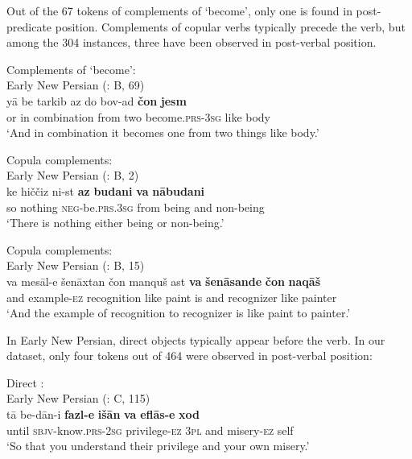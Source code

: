 \documentclass[output=paper,colorlinks,citecolor=brown,draftmode]{langscibook}
\begin{document}
Out of the 67 tokens of complements of `become', only one is found in post-predicate position. Complements of copular verbs typically precede the verb, but among the 304 instances, three have been observed in post-verbal position.

\ea\label{ENP:ex:12}
Complements of `become': \\
Early New Persian (\citealt{parizadeh_persian_2022}: B, 69) \\
\gll yā be tarkib az do bov-ad \textbf{čon} \textbf{jesm} \\
or in combination from two become\textsc{.prs-3sg} like body \\
\glt `And in combination it becomes one from two things like body.'
\z


\newpage
\ea\label{ENP:ex:13}
Copula complements: \\
Early New Persian (\citealt{parizadeh_persian_2022}: B, 2) \\
\gll ke hiččiz ni-st \textbf{az} \textbf{budani} \textbf{va} \textbf{nābudani} \\
so nothing \textsc{neg-}be\textsc{.prs.3sg} from being and non-being \\
\glt `There is nothing either being or non-being.'
\z

\ea\label{ENP:ex:14}
Copula complements: \\
Early New Persian (\citealt{parizadeh_persian_2022}: B, 15) \\
\gll va mesāl-e šenāxtan čon manquš ast \textbf{va} \textbf{šenāsande} \textbf{čon} \textbf{naqāš} \\
and example\textsc{-ez} recognition like paint is and recognizer like painter \\
\glt `And the example of recognition to recognizer is like paint to painter.' 
\z

In Early New Persian, direct objects typically appear before the verb. In our dataset, only four tokens out of 464 were observed in post-verbal position:

\ea\label{ENP:ex:15}
Direct : \\
Early New Persian (\citealt{parizadeh_persian_2022}: C, 115) \\
\gll tā be-dān-i \textbf{fazl-e} \textbf{išān} \textbf{va} \textbf{eflās-e} \textbf{xod} \\
until \textsc{sbjv-}know\textsc{.prs-2sg} privilege\textsc{-ez} \textsc{3pl} and misery\textsc{-ez} self \\
\glt `So that you understand their privilege and your own misery.' 
\z
\end{document}
